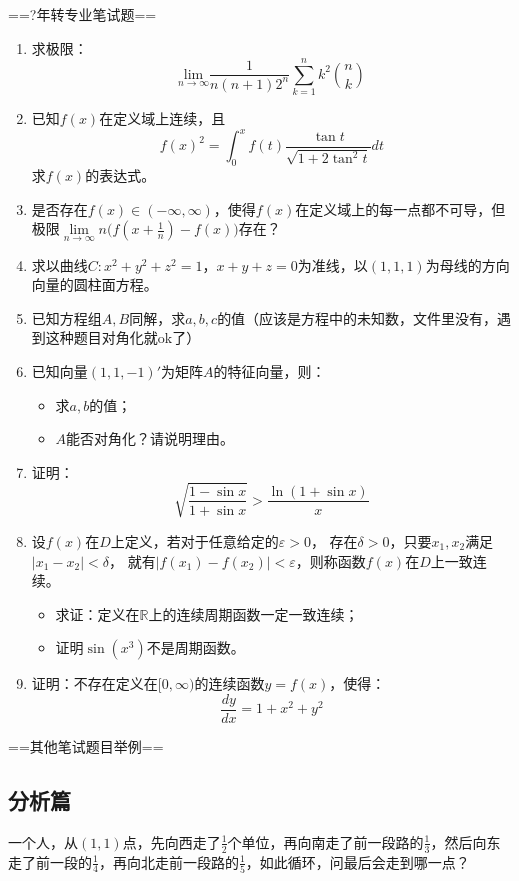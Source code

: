 ==?年转专业笔试题==
\begin{enumerate}
    \item 求极限：$$\underset{n\to \infty}{\text{lim}}\frac{1}{n(n+1)2^n}\sum\limits_{k=1}^n k^2\binom{n}{k}$$
    \item 已知$f(x)$在定义域上连续，且$$f(x)^2=\int_0^xf(t)\frac{\tan t}{\sqrt{1+2\tan^2t}}dt$$求$f(x)$的表达式。
    \item 是否存在$f(x)\in (-\infty,\infty)$，使得$f(x)$在定义域上的每一点都不可导，但极限$\lim\limits_{n\to \infty}n\big(f(x+\frac{1}{n})-f(x)\big)$存在？
    \item 求以曲线$C:x^2+y^2+z^2=1$，$x+y+z=0$为准线，以$(1,1,1)$为母线的方向向量的圆柱面方程。
    \item 已知方程组$A,B$同解，求$a,b,c$的值（应该是方程中的未知数，文件里没有，遇到这种题目对角化就ok了）
    \item 已知向量$(1,1,-1)'$为矩阵$A$的特征向量，则：
    \begin{itemize}
        \item 求$a,b$的值；
        \item $A$能否对角化？请说明理由。
    \end{itemize}
    \item 证明：
    $$
    \sqrt{\frac{1-\sin x}{1+\sin x}}>\frac{\ln(1+\sin x)}{x}
    $$
    \item 设$f(x)$在$D$上定义，若对于任意给定的$\varepsilon>0$，
    存在$\delta>0$，只要$x_1,x_2$满足$|x_1-x_2|<\delta$，
    就有$|f(x_1)-f(x_2)|<\varepsilon$，则称函数$f(x)$在$D$上一致连续。
    \begin{itemize}
        \item 求证：定义在$\mathbb{R}$上的连续周期函数一定一致连续；
        \item 证明$\sin (x^3)$不是周期函数。
    \end{itemize}
    \item 证明：不存在定义在$[0,\infty)$的连续函数$y=f(x)$，使得：$$\frac{dy}{dx}=1+x^2+y^2$$
\end{enumerate}


==其他笔试题目举例==
\subsection{分析篇}
\begin{example}
一个人，从$(1,1)$点，先向西走了$\frac{1}{2}$个单位，再向南走了前一段路的$\frac{1}{3}$，然后向东走了前一段的$\frac{1}{4}$，再向北走前一段路的$\frac{1}{5}$，如此循环，问最后会走到哪一点？
\end{example}

